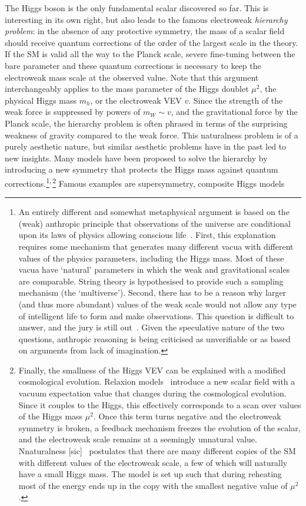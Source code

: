 The Higgs boson is the only fundamental scalar discovered so far. This
is interesting in its own right, but also leads to the famous
electroweak \emph{hierarchy problem}: in the absence of any protective
symmetry, the mass of a scalar field should receive quantum
corrections of the order of the largest scale in the theory. If the SM
is valid all the way to the Planck scale, severe fine-tuning between
the bare parameter and these quantum corrections is necessary to keep
the electroweak mass scale at the observed value. Note that this
argument interchangeably applies to the mass parameter of the Higgs
doublet $\mu^2$, the physical Higgs mass $m_h$, or the electroweak VEV
$v$. Since the strength of the weak force is suppressed by powers of
$m_W \sim v$, and the gravitational force by the Planck scale, the
hierarchy problem is often phrased in terms of the surprising weakness
of gravity compared to the weak force. This naturalness problem is of
a purely aesthetic nature, but similar aesthetic problems have in the
past led to new insights. Many models have been proposed to solve the
hierarchy by introducing a new symmetry that protects the Higgs mass
against quantum corrections.\footnote{An entirely different and
  somewhat metaphysical argument is based on the (weak) anthropic
  principle that observations of the universe are conditional upon its
  laws of physics allowing conscious life~\cite{Weinberg:1987dv,
    Barrow:1988yia}. First, this explanation requires some mechanism
  that generates many different vacua with different values of the
  physics parameters, including the Higgs mass. Most of these vacua
  have `natural' parameters in which the weak and gravitational
  scales are comparable. String theory is hypothesised to provide such
  a sampling mechanism (the `multiverse'). Second, there has to be a
  reason why larger (and thus more abundant) values of the weak scale
  would not allow any type of intelligent life to form and make
  observations. This question is difficult to answer, and the jury is
  still out~\cite{Agrawal:1997gf, Harnik:2006vj, Clavelli:2006di,
    Giudice:2008bi, Donoghue:2009me, Gedalia:2010iy,
    Adams:2015hvd}. Given the speculative nature of the two questions,
  anthropic reasoning is being criticised as unverifiable or as based
  on arguments from lack of
  imagination.}\textsuperscript{,\,}\footnote{Finally, the smallness
  of the Higgs VEV can be explained with a modified cosmological
  evolution. Relaxion models~\cite{Graham:2015cka} introduce a new
  scalar field with a vacuum expectation value that changes during the
  cosmological evolution. Since it couples to the Higgs, this
  effectively corresponds to a scan over values of the Higgs mass
  $\mu^2$. Once this term turns negative and the electroweak symmetry
  is broken, a feedback mechanism freezes the evolution of the scalar,
  and the electroweak scale remains at a seemingly unnatural
  value. Nnaturalness [sic]~\cite{Arkani-Hamed:2016rle} postulates
  that there are many different copies of the SM with different values
  of the electroweak scale, a few of which will naturally have a small
  Higgs mass. The model is set up such that during reheating most of
  the energy ends up in the copy with the smallest negative value of
  $\mu^2$.} Famous examples are supersymmetry, composite Higgs models
